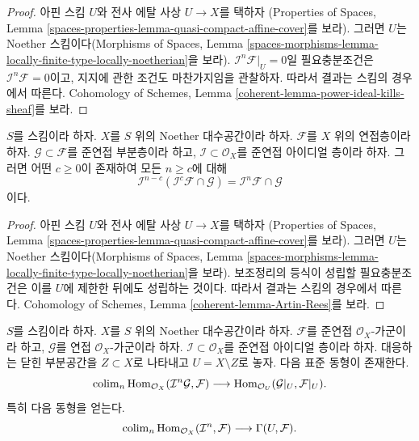 \begin{proof}
아핀 스킴 $U$와 전사 에탈 사상 $U \to X$를 택하자
(Properties of Spaces, Lemma
\ref{spaces-properties-lemma-quasi-compact-affine-cover}를 보라).
그러면 $U$는 Noether 스킴이다(Morphisms of Spaces, Lemma
\ref{spaces-morphisms-lemma-locally-finite-type-locally-noetherian}을 보라).
$\mathcal{I}^n\mathcal{F}|_U = 0$일 필요충분조건은
$\mathcal{I}^n\mathcal{F} = 0$이고, 지지에 관한 조건도 마찬가지임을
관찰하자. 따라서 결과는 스킴의 경우에서 따른다. Cohomology of Schemes,
Lemma \ref{coherent-lemma-power-ideal-kills-sheaf}를 보라.
\end{proof}

\begin{lemma}
\label{lemma-Artin-Rees}
$S$를 스킴이라 하자. $X$를 $S$ 위의 Noether 대수공간이라 하자.
$\mathcal{F}$를 $X$ 위의 연접층이라 하자.
$\mathcal{G} \subset \mathcal{F}$를 준연접 부분층이라 하고,
$\mathcal{I} \subset \mathcal{O}_X$를 준연접 아이디얼 층이라 하자.
그러면 어떤 $c \geq 0$이 존재하여 모든 $n \geq c$에 대해
$$
\mathcal{I}^{n - c}(\mathcal{I}^c\mathcal{F} \cap \mathcal{G})
=
\mathcal{I}^n\mathcal{F} \cap \mathcal{G}
$$
이다.
\end{lemma}

\begin{proof}
아핀 스킴 $U$와 전사 에탈 사상 $U \to X$를 택하자
(Properties of Spaces, Lemma
\ref{spaces-properties-lemma-quasi-compact-affine-cover}를 보라).
그러면 $U$는 Noether 스킴이다(Morphisms of Spaces, Lemma
\ref{spaces-morphisms-lemma-locally-finite-type-locally-noetherian}을 보라).
보조정리의 등식이 성립할 필요충분조건은 이를 $U$에 제한한 뒤에도
성립하는 것이다. 따라서 결과는 스킴의 경우에서 따른다. Cohomology of
Schemes, Lemma \ref{coherent-lemma-Artin-Rees}를 보라.
\end{proof}

\begin{lemma}
\label{lemma-homs-over-open}
$S$를 스킴이라 하자. $X$를 $S$ 위의 Noether 대수공간이라 하자.
$\mathcal{F}$를 준연접 $\mathcal{O}_X$-가군이라 하고,
$\mathcal{G}$를 연접 $\mathcal{O}_X$-가군이라 하자.
$\mathcal{I} \subset \mathcal{O}_X$를 준연접 아이디얼 층이라 하자.
대응하는 닫힌 부분공간을 $Z \subset X$로 나타내고
$U = X \setminus Z$로 놓자. 다음 표준 동형이 존재한다.
$$
\mathop{\mathrm{colim}}\nolimits_n \mathop{\mathrm{Hom}}\nolimits_{\mathcal{O}_X}(\mathcal{I}^n\mathcal{G}, \mathcal{F})
\longrightarrow
\mathop{\mathrm{Hom}}\nolimits_{\mathcal{O}_U}(\mathcal{G}|_U, \mathcal{F}|_U).
$$
특히 다음 동형을 얻는다.
$$
\mathop{\mathrm{colim}}\nolimits_n \mathop{\mathrm{Hom}}\nolimits_{\mathcal{O}_X}(\mathcal{I}^n, \mathcal{F})
\longrightarrow
\Gamma(U, \mathcal{F}).
$$
\end{lemma}

